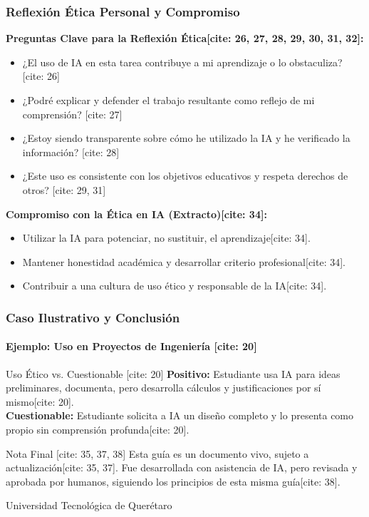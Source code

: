 \documentclass{beamer}
\begin{document}
	\begin{frame}
		\frametitle{Reflexión Ética Personal y Compromiso}
		\textbf{Preguntas Clave para la Reflexión Ética[cite: 26, 27, 28, 29, 30, 31, 32]:}
		\begin{itemize}
			\item ¿El uso de IA en esta tarea contribuye a mi aprendizaje o lo obstaculiza? [cite: 26]
			\item ¿Podré explicar y defender el trabajo resultante como reflejo de mi comprensión? [cite: 27]
			\item ¿Estoy siendo transparente sobre cómo he utilizado la IA y he verificado la información? [cite: 28]
			\item ¿Este uso es consistente con los objetivos educativos y respeta derechos de otros? [cite: 29, 31]
		\end{itemize}
		\vspace{0.5em}
		\textbf{Compromiso con la Ética en IA (Extracto)[cite: 34]:}
		\begin{itemize}
			\item Utilizar la IA para potenciar, no sustituir, el aprendizaje[cite: 34].
			\item Mantener honestidad académica y desarrollar criterio profesional[cite: 34].
			\item Contribuir a una cultura de uso ético y responsable de la IA[cite: 34].
		\end{itemize}
	\end{frame}
	
	\begin{frame}
		\frametitle{Caso Ilustrativo y Conclusión}
		\framesubtitle{Ejemplo: Uso en Proyectos de Ingeniería [cite: 20]}
		\begin{block}{Uso Ético vs. Cuestionable [cite: 20]}
			\textbf{Positivo:} Estudiante usa IA para ideas preliminares, documenta, pero desarrolla cálculos y justificaciones por sí mismo[cite: 20]. \\
			\textbf{Cuestionable:} Estudiante solicita a IA un diseño completo y lo presenta como propio sin comprensión profunda[cite: 20].
		\end{block}
		\vspace{1em}
		\begin{alertblock}{Nota Final [cite: 35, 37, 38]}
			Esta guía es un documento vivo, sujeto a actualización[cite: 35, 37]. Fue desarrollada con asistencia de IA, pero revisada y aprobada por humanos, siguiendo los principios de esta misma guía[cite: 38].
		\end{alertblock}
		\vfill
		\centering
		Universidad Tecnológica de Querétaro
	\end{frame}
	
\end{document}
